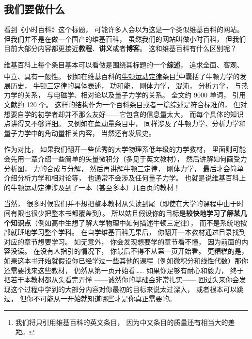 
\subsection{我们要做什么}

看到《小时百科》这个标题， 可能许多人会以为这是一个类似维基百科的网站。 但我们并不是在做一个国产的维基百科， 虽然我们的网站叫做小时百科， 但我们目前大部分内容都更接近\textbf{教程}、\textbf{讲义}或者\textbf{博客}。 这和维基百科有什么区别呢？

维基百科上每个条目基本可以看做是围绕其标题的一个\textbf{综述}， 追求全面、客观、中立、具有一般性。 例如在维基百科的\href{https://en.wikipedia.org/wiki/Newton's_laws_of_motion}{牛顿运动定律}条目\footnote{我们将只引用维基百科的英文条目， 因为中文条目的质量还有相当大的差距。}中囊括了牛顿力学的发展历史， 牛顿三定律的具体表述， 功和能， 刚体力学， 混沌， 分析力学， 与热力学的关系， 与电磁学、相对论以及量子力学的关系。 全文约 9000 单词， 引用文献约 120 个。 这样的结构作为一个百科条目或者一篇综述是符合标准的， 但对想要自学的初学者却并不那么友好——它包含的信息量太大， 而每个具体的知识点讲得又不够详细。 又例如在\href{https://en.wikipedia.org/wiki/Angular_momentum}{角动量}条目中， 同样涉及了牛顿力学、分析力学和量子力学中的角动量相关内容， 当然还有发展史。

作为对比， 如果我们翻开一些优秀的大学物理系低年级的力学教材， 里面则可能会先用一章介绍一些简单的矢量微积分（多见于英文教材）， 然后讲解如何画受力分析图， 力的合成与分解， 然后再讲解牛顿三定律， 刚体力学， 最后才会简单介绍分析力学和相对论等， 也通常不会涉及任何量子力学。 也就是说维基百科上的牛顿运动定律涉及到了一本（甚至多本）几百页的教材！

当然， 很多时候我们并不想把整本教材从头读到尾（即使在大学的课程中由于时间有限也很少把整本书都覆盖到）。 所以姑且假设你的目标是\textbf{较快地学习了解某几个知识点}（例如高中生想了解大学物理中如何描述牛顿三定律）， 而不是系统地按部就班地学习整个学科。 在自学维基百科无果后， 你翻开一本教材通过目录找到对应的章节想要学习。 如无意外， 你会发现想要学的章节看不懂， 因为前面的内容没读。 在没有人指引的情况下， 你最后不得不从第一页开始看。 更糟糕的是， 如果这本书开始就假设你已经学过一些其他的课程（例如微积分和线性代数）那你还需要找来这些教材， 仍然从第一页开始看…… 如果你足够有耐心和毅力， 终于把若干本教材都从头看完弄懂 ——诚然你的基础会非常扎实—— 回过头来你会发现这个过程中学到的大部分内容对你最初的目标来说太过深入， 或者根本可以跳过， 但你不可能从一开始就知道哪些才是你真正需要的。

